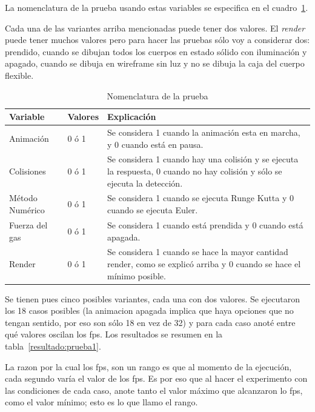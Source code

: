 La nomenclatura de la prueba usando estas variables se especifica en el cuadro~\ref{nomenclatura:prueba}.

Cada una de las variantes arriba mencionadas puede tener dos valores. El \emph{\foreignlanguage{english}{render}} puede tener muchos valores pero para hacer las pruebas sólo voy a considerar dos: prendido, cuando se dibujan todos los cuerpos en estado sólido con iluminación y apagado, cuando se dibuja en wireframe sin luz y no se dibuja la caja del cuerpo flexible.

\begin{table}
\begin{center}
\begin{tabular} {@{}llp{10cm}@{}}
\toprule
 Variable & Valores & Explicación\\
\midrule 
 Animación & 0 ó 1 & Se considera 1 cuando la animación esta en marcha, y 0 cuando está en pausa. \\
 Colisiones & 0 ó 1 & Se considera 1 cuando hay una colisión y se ejecuta la respuesta, 0 cuando no hay colisión y sólo se ejecuta la detección. \\
 Método Numérico & 0 ó 1 & Se considera 1 cuando se ejecuta Runge Kutta y 0 cuando se ejecuta Euler. \\
 Fuerza del gas & 0 ó 1 & Se considera 1 cuando está prendida y 0 cuando está apagada. \\
 Render & 0 ó 1 & Se considera 1 cuando se hace la mayor cantidad render, como se explicó arriba y 0 cuando se hace el mínimo posible. \\
\bottomrule
\end{tabular}
\end{center}
\caption[Explicación de la nomenclatura de la prueba del programa]{Nomenclatura de la prueba}
\label{nomenclatura:prueba}
\end{table}

Se tienen pues cinco posibles variantes, cada una con dos valores. Se ejecutaron los 18 casos posibles (la animacion apagada implica que haya opciones que no tengan sentido, por eso son sólo 18 en vez de 32) y para cada caso anoté entre qué valores oscilan los fps. Los resultados se resumen en la tabla~\ref{resultado:prueba1}.

La razon por la cual los fps, son un rango es que al momento de la ejecución, cada segundo varía el valor de los fps. Es por eso que al hacer el experimento con las condiciones de cada caso, anote tanto el valor máximo que alcanzaron lo fps, como el valor mínimo; esto es lo que llamo el rango.

